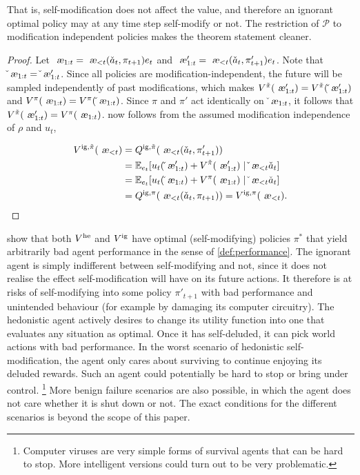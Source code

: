\documentclass[a4paper]{article}
\theoremstyle{definition}
\theoremstyle{remark}
\def\EE{{\mathbb{E}}}  %
\let\aechar\ae %
\renewcommand{\ae}{
\ifmmode\mathchoice{
	\mbox{\textsl{\aechar}}
}{
	\mbox{\textsl{\aechar}}
}{
	\mbox{\scriptsize\textsl{\aechar}}
}{
	\mbox{\scriptsize\textsl{\aechar}}
}\else\aechar\fi%
}                         %
\newcommand*{\Vhe}[1][]{V^{{\rm he} #1}}
\newcommand*{\Qig}[1][]{Q^{{\rm ig} #1}}
\newcommand*{\Vig}[1][]{V^{{\rm ig} #1}}
\newcommand*{\Po}{{\mathcal P}}
\renewcommand{\hat}{\check}
\begin{document}
That is, self-modification does not affect the value, and therefore
an ignorant optimal policy may at any time step self-modify or not.
The restriction of $\Po$ to modification independent policies makes
the theorem statement cleaner.

\begin{proof}
  Let
  $\ae_{1:t}=\ae_{<t}(\hat a_t,\pi_{t+1})e_t$
  and
  $\ae_{1:t}'=\ae_{<t}(\hat a_t,\pi_{t+1}')e_t$.
  Note that $\hat\ae_{1:t}=\hat\ae_{1:t}'$.
  Since all policies are modification-independent,
  the future will be sampled independently of past modifications,
  which makes $V^{\tilde\pi}(\ae_{1:t}')=V^{\tilde\pi}(\hat\ae_{1:t}')$
  and $V^{\pi}(\ae_{1:t})=V^{\pi}(\hat\ae_{1:t})$.
  Since $\pi$ and $\pi'$ act identically on $\hat\ae_{1:t}$,
  it follows that $V^{\tilde\pi}(\ae_{1:t}')=V^{\pi}(\ae_{1:t})$.
   now follows
  from the assumed modification independence of $\rho$ and $u_t$,

  \begin{align*}
    \Vig[,\tilde\pi](\ae_{<t})
    &= \Qig[,\tilde\pi](\ae_{<t}(\hat a_t,\pi_{t+1}'))\\
    &= \EE_{e_t}[u_t(\hat\ae_{1:t}') + V^{\tilde\pi}(\ae_{1:t}')\mid\hat\ae_{<t}\hat a_t]\\
    &= \EE_{e_t}[u_t(\hat\ae_{1:t}) + V^{\pi}(\ae_{1:t})\mid\hat\ae_{<t}\hat a_t]\\
    &=\Qig[,\pi](\ae_{<t}(\hat a_t,\pi_{t+1}))
     = \Vig[,\pi](\ae_{<t}).\qedhere
  \end{align*}
\end{proof}

 show that both $\Vhe$ and $\Vig$
have optimal (self-modifying) policies $\pi^*$ that yield arbitrarily
bad agent performance in the sense of \cref{def:performance}.
The ignorant agent is simply indifferent between self-modifying and not,
since it does not realise the effect self-modification will have on
its future actions.
It therefore is at risks of self-modifying into some policy $\pi'_{t+1}$ with
bad performance and unintended behaviour
(for example by damaging its computer circuitry).
The hedonistic agent actively desires to change its utility function into
one that evaluates any situation as optimal.
Once it has self-deluded, it can pick world actions with bad performance.
In the worst scenario of hedonistic self-modification,
the agent only cares about surviving to continue enjoying
its deluded rewards.
Such an agent
could potentially be hard to stop or bring under control.%
\footnote{Computer viruses are very simple forms of survival agents
that can be hard to stop.
More intelligent versions could turn out to be very problematic.}
More benign failure scenarios are also possible,
in which the agent does not care whether it is shut down or not.
The exact conditions for the different scenarios is beyond the scope
of this paper.
\end{document}
